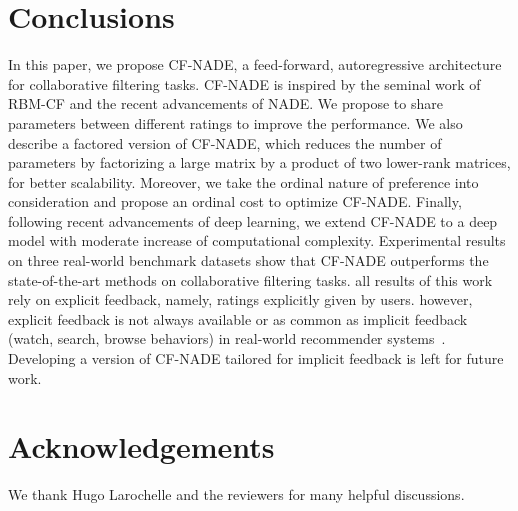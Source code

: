 \documentclass{article}
\newcommand{\cfnade}{CF-NADE\xspace}
\begin{document}
\section{Conclusions}
\label{sec:conclusion}

In this paper, we propose \cfnade, a feed-forward, autoregressive
architecture for collaborative filtering tasks. \cfnade is inspired by
the seminal work of RBM-CF and the
recent advancements of NADE. We 
propose to share parameters between different ratings to improve the
performance. We also describe a factored version of
\cfnade, which reduces the number of parameters by factorizing a large matrix by a product of two lower-rank matrices,
for better scalability. Moreover, we take the ordinal nature of
preference into consideration and propose an ordinal cost to optimize \cfnade. Finally,
following recent advancements of deep learning, we extend \cfnade to a
deep model with moderate increase of computational
complexity. Experimental results on three real-world benchmark datasets show
that \cfnade outperforms the state-of-the-art methods on
collaborative filtering tasks. all results of this work rely on explicit feedback, namely, ratings explicitly given by users. however, explicit feedback is not always available or as common as implicit feedback (watch, search, browse behaviors) in real-world recommender systems~\cite{hu2008collaborative}. Developing a version of \cfnade tailored for implicit feedback is left for future work.

\section*{Acknowledgements} 
We thank Hugo Larochelle and the reviewers for many helpful discussions.



\end{document}
